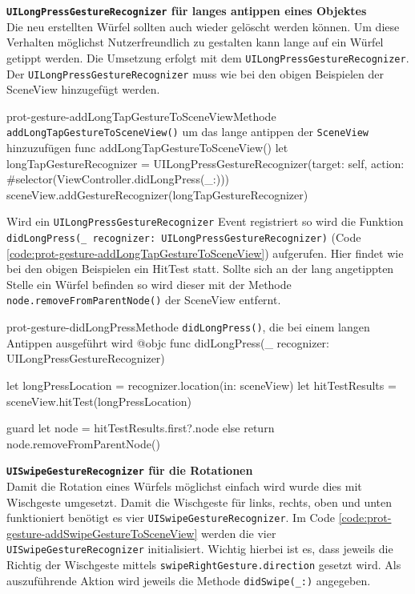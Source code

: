 \begin{description}
    \textbf{\texttt{UILongPressGestureRecognizer} für langes antippen eines Objektes}\\
    Die neu erstellten Würfel sollten auch wieder gelöscht werden können. Um diese Verhalten möglichst Nutzerfreundlich zu gestalten kann lange auf ein Würfel getippt werden. Die Umsetzung erfolgt mit dem \texttt{UILongPressGestureRecognizer}. Der \texttt{UILongPressGestureRecognizer} muss wie bei den obigen Beispielen der SceneView hinzugefügt werden.

    \begin{code}{prot-gesture-addLongTapGestureToSceneView}{Methode \texttt{addLongTapGestureToSceneView()} um das lange antippen der \texttt{SceneView} hinzuzufügen}
    func addLongTapGestureToSceneView() {
        let longTapGestureRecognizer = UILongPressGestureRecognizer(target: self, action: #selector(ViewController.didLongPress(\_:)))
        sceneView.addGestureRecognizer(longTapGestureRecognizer)
    }
    \end{code}

    Wird ein \texttt{UILongPressGestureRecognizer} Event registriert so wird die Funktion \texttt{didLongPress(\_ recognizer: UILongPressGestureRecognizer)} (Code \ref{code:prot-gesture-addLongTapGestureToSceneView}) aufgerufen. Hier findet wie bei den obigen Beispielen ein HitTest statt. Sollte sich an der lang angetippten Stelle ein Würfel befinden so wird dieser mit der Methode \texttt{node.removeFromParentNode()} der SceneView entfernt.

    \begin{code}{prot-gesture-didLongPress}{Methode \texttt{didLongPress()}, die bei einem langen Antippen ausgeführt wird}
    @objc
    func didLongPress(\_ recognizer: UILongPressGestureRecognizer) {
        let longPressLocation = recognizer.location(in: sceneView)
        let hitTestResults = sceneView.hitTest(longPressLocation)
        
        guard let node = hitTestResults.first?.node else { return }
        node.removeFromParentNode()
    }
    \end{code}
    
    \textbf{\texttt{UISwipeGestureRecognizer} für die Rotationen}\\
    Damit die Rotation eines Würfels möglichst einfach wird wurde dies mit Wischgeste umgesetzt. Damit die Wischgeste für links, rechts, oben und unten funktioniert benötigt es vier \texttt{UISwipeGestureRecognizer}. Im Code \ref{code:prot-gesture-addSwipeGestureToSceneView} werden die vier \texttt{UISwipeGestureRecognizer} initialisiert. Wichtig hierbei ist es, dass jeweils die Richtig der Wischgeste mittels \texttt{swipeRightGesture.direction} gesetzt wird. Als auszuführende Aktion wird jeweils die Methode \texttt{didSwipe(\_:)} angegeben.


\end{description}
